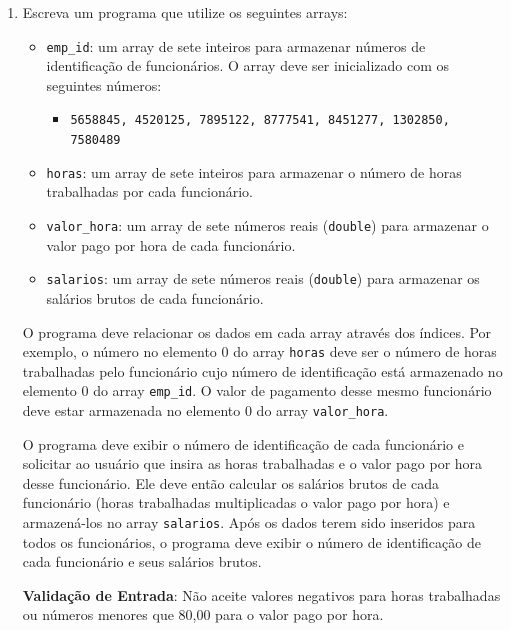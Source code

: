 \documentclass[12pt]{article}
\begin{document}
\begin{enumerate}
      \item Escreva um programa que utilize os seguintes arrays:
            \begin{itemize}
                  \item \texttt{emp\_id}: um array de sete inteiros para armazenar números de identificação de funcionários. O array deve ser inicializado com os seguintes números:
                  \begin{itemize}
                        \item \texttt{5658845, 4520125, 7895122, 8777541, 8451277, 1302850, 7580489}
                  \end{itemize}
                  \item \texttt{horas}: um array de sete inteiros para armazenar o número de horas trabalhadas por cada funcionário.
                  \item \texttt{valor\_hora}: um array de sete números reais (\texttt{double}) para armazenar o valor pago por hora de cada funcionário.
                  \item \texttt{salarios}: um array de sete números reais (\texttt{double}) para armazenar os salários brutos de cada funcionário.
            \end{itemize}

            O programa deve relacionar os dados em cada array através dos índices. Por exemplo, o número no elemento 0 do array \texttt{horas} deve ser o número de horas trabalhadas pelo funcionário cujo número de identificação está armazenado no elemento 0 do array \texttt{emp\_id}. O valor de pagamento desse mesmo funcionário deve estar armazenada no elemento 0 do array \texttt{valor\_hora}.

            O programa deve exibir o número de identificação de cada funcionário e solicitar ao usuário que insira as horas trabalhadas e o valor pago por hora desse funcionário. Ele deve então calcular os salários brutos de cada funcionário (horas trabalhadas multiplicadas o valor pago por hora) e armazená-los no array \texttt{salarios}. Após os dados terem sido inseridos para todos os funcionários, o programa deve exibir o número de identificação de cada funcionário e seus salários brutos.

            \textbf{Validação de Entrada}: Não aceite valores negativos para horas trabalhadas ou números menores que 80,00 para o valor pago por hora.


\end{enumerate}
\end{document}
